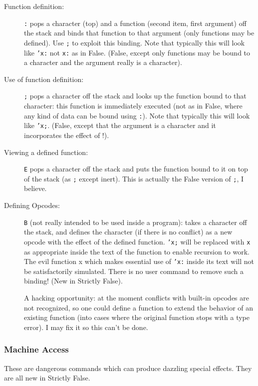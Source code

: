 \documentclass[12pt]{article}
\begin{document}
\begin{description}
\item[Function definition:]  {\tt :} pops a character (top)
and a function (second item, first argument) off the stack and binds
that function to that argument (only functions may be defined).  Use
{\tt ;} to exploit this binding.  Note that typically this will look
like {\tt 'x:} not {\tt x:} as in False.  (False, except only functions
may be bound to a character and the argument really is a character).

\item[Use of function definition:] {\tt ;} pops a character off
the stack and looks up the function bound to that character: this
function is immediately executed (not as in False, where any kind of
data can be bound using {\tt :}).  Note that typically this will
look like {\tt 'x;}. (False, except that the argument is a character
and it incorporates the effect of !).

\item[Viewing a defined function:] {\tt E} pops a character off the
stack and puts the function bound to it on top of the stack (as {\tt ;}
except inert).  This is actually the False version of {\tt ;}, I
believe.

\item[Defining Opcodes:] {\tt B} (not really intended to be used
inside a program): takes a character off the stack, and defines the
character (if there is no conflict) as a new opcode with the effect of
the defined function.  {\tt 'x;} will be replaced with {\tt x} as
appropriate inside the text of the function to enable recursion to
work.  The evil function x which makes essential use of {\tt 'x:}
inside its text will not be satisfactorily simulated.  There is no
user command to remove such a binding!  (New in Strictly False).

A hacking opportunity:  at the moment conflicts with built-in
opcodes are not recognized, so one could define a function to extend
the behavior of an existing function (into cases where the original
function stops with a type error).  I may fix it so this can't be done.
\end{description}
\subsubsection{Machine Access}

These are dangerous commands which can produce dazzling special
effects.  They are all new in Strictly False.
\end{document}
